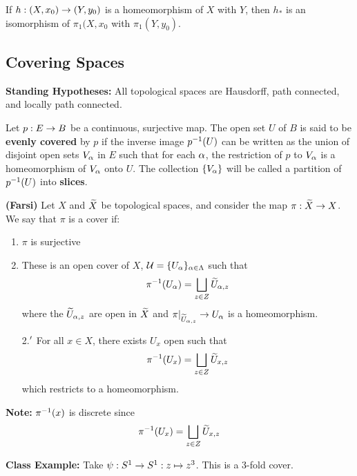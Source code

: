 \begin{cor}
If $h:(X, x_0)\rightarrow (Y, y_0)$ is a homeomorphism of $X$ with $Y$, then $h_*$ is an isomorphism of $\pi_1(X, x_0$ with $\pi_1(Y, y_0)$.
\end{cor}



\subsection{Covering Spaces}\nl
\setcounter{section}{53}
\setcounter{thm}{0}

\textbf{Standing Hypotheses:} All topological spaces are Hausdorff, path connected, and locally path connected.

\vs

\dfn Let $p: E\rightarrow B$ be a continuous, surjective map. The open set $U$ of $B$ is said to be \textbf{evenly covered} by $p$ if the inverse image $p^{-1}(U)$ can be written as the union of disjoint open sets $V_\alpha$ in $E$ such that for each $\alpha$, the restriction of $p$ to $V_\alpha$ is a homeomorphism of $V_\alpha$ onto $U$. The collection $\{V_\alpha\}$ will be called a partition of $p^{-1}(U)$ into \textbf{slices}.

\vs

\dfn \textbf{(Farsi)} Let $X$ and $\widetilde X$ be topological spaces, and consider the map $\pi:\widetilde X\rightarrow  X$. We say that $\pi$ is a cover if:
\begin{enumerate}
    \item $\pi$ is surjective
    \item These is an open cover of $X$, $\mathcal{U} = \{U_\alpha\}_{\alpha\in \Lambda}$ such that 
    \[\pi^{-1}(U_\alpha) = \bigsqcup_{z\in Z}\widetilde U_{\alpha, z}\]
    where the $\widetilde U_{\alpha, z}$ are open in $\widetilde X$ and $\pi|_{\widetilde U_{\alpha, z}}\rightarrow U_\alpha$ is a homeomorphism.
    \item[2.$^\prime$] For all $x\in X$, there exists $U_x$ open such that 
    \[\pi^{-1}(U_x) = \bigsqcup_{z\in Z} \widetilde U_{x, z}\]
    which restricts to a homeomorphism.
\end{enumerate}

\vs

\textbf{Note:} $\pi^{-1}(x)$ is discrete since
\[\pi^{-1}(U_x) = \bigsqcup_{z\in Z} \widetilde U_{x, z}\]

\vs

\textbf{Class Example:} Take $\psi:S^1\rightarrow S^1: z\mapsto z^3$. This is a 3-fold cover.

